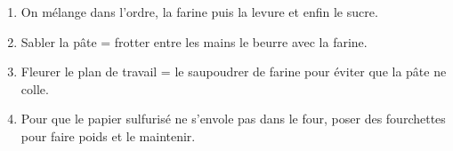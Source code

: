 
\begin{enumerate}

\item  On m\'elange dans l'ordre, la farine puis la levure et enfin
  le sucre.
  
\item Sabler la p\^ate = frotter entre les mains le beurre avec la
  farine.
  
\item Fleurer le plan de travail = le saupoudrer de farine pour
  \'eviter que la p\^ate ne colle.
  
\item Pour que le papier sulfuris\'e ne s'envole pas dans le four,
  poser des fourchettes pour faire poids et le maintenir.
  
\end{enumerate}